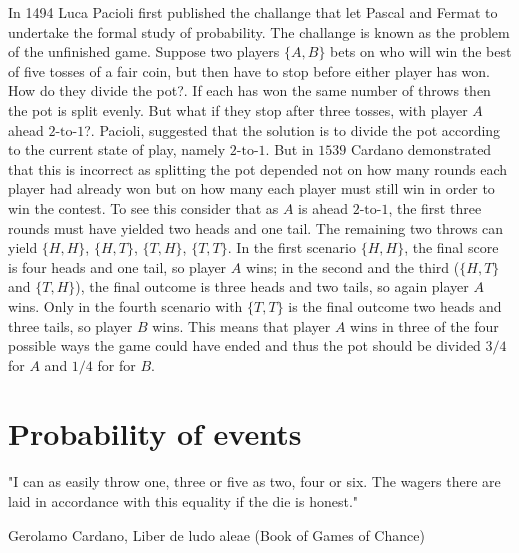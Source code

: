 \myindent In 1494 Luca Pacioli first published the challange that let Pascal and Fermat to undertake the formal study of probability. The challange is known as the problem of the unfinished game. Suppose two players $\{A, B\}$ bets on who will win the best of five tosses of a fair coin, but then have to stop before either player has won. How do they divide the pot?. If each has won the same number of throws then the pot is split evenly. But what if they stop after three tosses, with player $A$ ahead $2\text{-to-}1$?. Pacioli, suggested that the solution is to divide the pot according to the current state of play, namely $2\text{-to-}1$. But in $1539$ Cardano demonstrated that this is incorrect as splitting the pot depended not on how many rounds each player had already won but on how many each player must still win in order to win the contest. To see this consider that as $A$ is ahead $2\text{-to-}1$, the first three rounds must have yielded two heads and one tail. The remaining two throws can yield $\{H,H\}$, $\{H,T\}$, $\{T,H\}$, $\{T,T\}$. In the first scenario $\{H,H\}$, the final score is four heads and one tail, so player $A$ wins; in the second and the third ($\{H,T\}$ and $\{T,H\}$), the final outcome is three heads and two tails, so again player $A$ wins. Only in the fourth scenario with $\{T,T\}$ is the final outcome two heads and three tails, so player $B$ wins. This means that player $A$ wins in three of the four possible ways the game could have ended and thus the pot should be divided $3/4$ for $A$ and $1/4$ for for $B$. 

\section{Probability of events}
\epigraph{"I can as easily throw one, three or five as two, four or six. The wagers there are laid in accordance with this equality if the die is honest."}{\textup{Gerolamo Cardano}, Liber de ludo aleae (Book of Games of Chance)}

